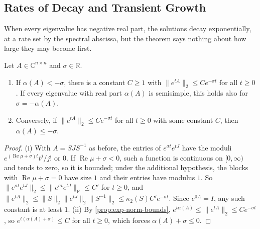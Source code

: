 \subsection{Rates of Decay and Transient Growth}

When every eigenvalue has negative real part, the solutions decay exponentially, at a rate set by the spectral abscissa, but the theorem says nothing about how large they may become first.

\begin{proposition}
\label{prop:decay-estimate}
Let $A\in\mathbb C^{n\times n}$ and $\sigma\in\mathbb R$.
\begin{enumerate}
\item If $\alpha(A)<-\sigma$, there is a constant $C\ge1$ with $\|e^{tA}\|_2\le Ce^{-\sigma t}$ for all $t\ge0$. If every eigenvalue with real part $\alpha(A)$ is semisimple, this holds also for $\sigma=-\alpha(A)$.
\item Conversely, if $\|e^{tA}\|_2\le Ce^{-\sigma t}$ for all $t\ge0$ with some constant $C$, then $\alpha(A)\le-\sigma$.
\end{enumerate}
\end{proposition}

\begin{proof}
(i) With $A=SJS^{-1}$ as before, the entries of $e^{\sigma t}e^{tJ}$ have the moduli $e^{(\operatorname{Re}\mu+\sigma)t}t^j/j!$ or $0$. If $\operatorname{Re}\mu+\sigma<0$, such a function is continuous on $[0,\infty)$ and tends to zero, so it is bounded; under the additional hypothesis, the blocks with $\operatorname{Re}\mu+\sigma=0$ have size $1$ and their entries have modulus $1$. So $\|e^{\sigma t}e^{tJ}\|_2\le\|e^{\sigma t}e^{tJ}\|_{\mathrm F}\le C'$ for $t\ge0$, and $\|e^{tA}\|_2\le\|S\|_2\|e^{tJ}\|_2\|S^{-1}\|_2\le\kappa_2(S)C'e^{-\sigma t}$. Since $e^{0A}=I$, any such constant is at least $1$. (ii) By \cref{prop:exp-norm-bounds}, $e^{t\alpha(A)}\le\|e^{tA}\|_2\le Ce^{-\sigma t}$, so $e^{t(\alpha(A)+\sigma)}\le C$ for all $t\ge0$, which forces $\alpha(A)+\sigma\le0$.
\end{proof}


